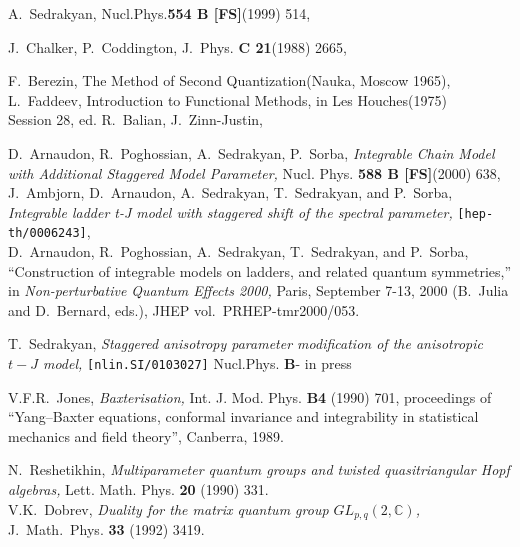 \documentclass[a4paper,a4paper]{article}
\def\CC{{\mathbb C}}
\begin{document}
\begin{thebibliography}{10}

 A.~Sedrakyan, Nucl.Phys.{\bf 554 B [FS]}(1999) 514,

 J.~Chalker, P.~Coddington, J.~Phys. {\bf C 21}(1988) 2665,

 F.~Berezin,  The Method of Second Quantization(Nauka,
  Moscow 1965), \\
  L.~Faddeev, Introduction to Functional Methods, in Les Houches(1975)\\
  Session 28, ed. R.~Balian, J.~Zinn-Justin,

  D.~Arnaudon, R.~Poghossian, A.~Sedrakyan, P.~Sorba,  
  \textsl{Integrable Chain Model with Additional Staggered Model
  Parameter,} Nucl. Phys. {\bf 588 B [FS]}(2000) 638, 
\\
  J.~Ambjorn, D.~Arnaudon, A.~Sedrakyan, T.~Sedrakyan, and P.~Sorba,
  \textsl{Integrable 
  ladder t-{J} model with staggered shift of the spectral parameter,}
  \texttt{[hep-th/0006243]},
\\
  D.~Arnaudon, R.~Poghossian, A.~Sedrakyan, T.~Sedrakyan, and
  P.~Sorba, ``Construction of integrable models on ladders, and
  related quantum  symmetries,'' in {\em Non-perturbative Quantum
  Effects 2000,} Paris, September 7-13,  2000 (B.~Julia and
  D.~Bernard, eds.),  JHEP vol.~PRHEP-tmr2000/053. 

 T.~Sedrakyan, \textsl{Staggered anisotropy parameter
modification of the anisotropic $t-J$ model,} \texttt{[nlin.SI/0103027]}
Nucl.Phys. {\bf B}- in press

  V.F.R.~Jones, \textsl{Baxterisation,} Int.  J. Mod.  Phys.  \textbf{B4}
  (1990) 701, proceedings of ``Yang--Baxter equations, conformal invariance
  and integrability in statistical mechanics and field theory'', Canberra,
  1989.
 
 N.~Reshetikhin,   
  \textsl{Multiparameter quantum groups and twisted quasitriangular 
    {H}opf algebras,}
  Lett. Math. Phys. \textbf{20} (1990) 331.
  \\
  V.K.~Dobrev,   \textsl{Duality for the matrix quantum group
  $GL_{p,q}(2,\CC)$,} 
  J.~Math.~Phys. \textbf{33} (1992) 3419.


\end{thebibliography}
\end{document}

